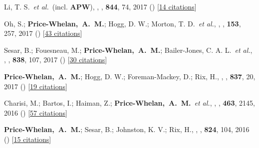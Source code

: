 \item[{\color{deemph}\scriptsize27}]Li, T. S.~\textit{et al.}~(incl. \textbf{APW}), , \apj, \textbf{844}, 74, 2017 () [\href{http://adsabs.harvard.edu/abs/2017ApJ...844...74L}{14 citations}]

\item[{\color{deemph}\scriptsize26}]Oh, S.; \textbf{Price-Whelan,~A.~M.}; Hogg, D. W.; Morton, T. D.~\textit{et al.}, , \aj, \textbf{153}, 257, 2017 () [\href{http://adsabs.harvard.edu/abs/2017AJ....153..257O}{43 citations}]

\item[{\color{deemph}\scriptsize25}]Sesar, B.; Fouesneau, M.; \textbf{Price-Whelan,~A.~M.}; Bailer-Jones, C. A. L.~\textit{et al.}, , \apj, \textbf{838}, 107, 2017 () [\href{http://adsabs.harvard.edu/abs/2017ApJ...838..107S}{30 citations}]

\item[{\color{deemph}\scriptsize24}]\textbf{Price-Whelan,~A.~M.}; Hogg, D. W.; Foreman-Mackey, D.; Rix, H., , \apj, \textbf{837}, 20, 2017 () [\href{http://adsabs.harvard.edu/abs/2017ApJ...837...20P}{19 citations}]

\item[{\color{deemph}\scriptsize23}]Charisi, M.; Bartos, I.; Haiman, Z.; \textbf{Price-Whelan,~A.~M.}~\textit{et al.}, , \mnras, \textbf{463}, 2145, 2016 () [\href{http://adsabs.harvard.edu/abs/2016MNRAS.463.2145C}{57 citations}]

\item[{\color{deemph}\scriptsize22}]\textbf{Price-Whelan,~A.~M.}; Sesar, B.; Johnston, K. V.; Rix, H., , \apj, \textbf{824}, 104, 2016 () [\href{http://adsabs.harvard.edu/abs/2016ApJ...824..104P}{15 citations}]


